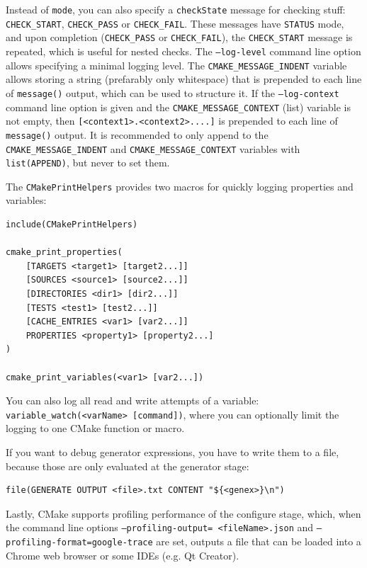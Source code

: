 \documentclass[table, xcdraw]{article}%
\begin{document}
Instead of \texttt{mode}, you can also specify a \texttt{checkState} message for checking stuff: \texttt{CHECK_START}, \texttt{CHECK_PASS} or \texttt{CHECK_FAIL}. These messages have \texttt{STATUS} mode, and upon completion (\texttt{CHECK_PASS} or \texttt{CHECK_FAIL}), the \texttt{CHECK_START} message is repeated, which is useful for nested checks.
The \texttt{--log-level} command line option allows specifying a minimal logging level. The \texttt{CMAKE_MESSAGE_INDENT} variable allows storing a string (prefarably only whitespace) that is prepended to each line of \texttt{message()} output, which can be used to structure it. If the \texttt{--log-context} command line option is given and the \texttt{CMAKE_MESSAGE_CONTEXT} (list) variable is not empty, then \texttt{[<context1>.<context2>....]} is prepended to each line of \texttt{message()} output. It is recommended to only append to the \texttt{CMAKE_MESSAGE_INDENT} and \texttt{CMAKE_MESSAGE_CONTEXT} variables with \texttt{list(APPEND)}, but never to set them.

The \texttt{CMakePrintHelpers} provides two macros for quickly logging properties and variables:

\begin{verbatim}
include(CMakePrintHelpers)

cmake_print_properties(
    [TARGETS <target1> [target2...]]
    [SOURCES <source1> [source2...]]
    [DIRECTORIES <dir1> [dir2...]]
    [TESTS <test1> [test2...]]
    [CACHE_ENTRIES <var1> [var2...]]
    PROPERTIES <property1> [property2...]
)

cmake_print_variables(<var1> [var2...])
\end{verbatim}

You can also log all read and write attempts of a variable: \texttt{variable_watch(<varName> [command])}, where you can optionally limit the logging to one CMake function or macro.

If you want to debug generator expressions, you have to write them to a file, because those are only evaluated at the generator stage:

\begin{verbatim}
file(GENERATE OUTPUT <file>.txt CONTENT "${<genex>}\n")
\end{verbatim}

Lastly, CMake supports profiling performance of the configure stage, which, when the command line options \texttt{--profiling-output= <fileName>.json} and \texttt{--profiling-format=google-trace} are set, outputs a file that can be loaded into a Chrome web browser or some IDEs (e.g. Qt Creator).
\end{document}
